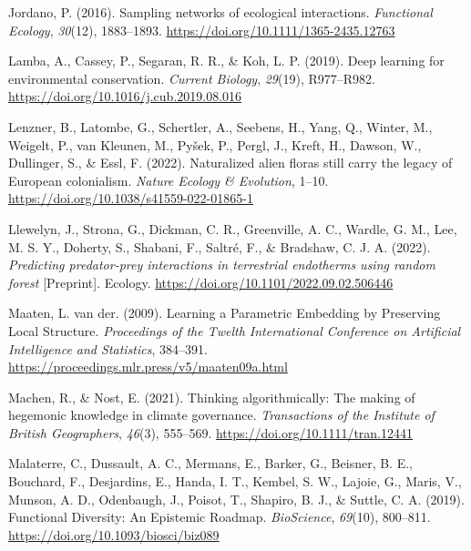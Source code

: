 \documentclass[11pt]{article}
\newlength{\cslhangindent}
\newenvironment{CSLReferences}[2] %
 {%
  \setlength{\parindent}{0pt}
  \ifodd #1 \everypar{\setlength{\hangindent}{\cslhangindent}}\ignorespaces\fi
  \ifnum #2 > 0
  \setlength{\parskip}{#2\baselineskip}
  \fi
 }%
 {}
\begin{document}
\begin{CSLReferences}{1}{0}
\leavevmode{}%
Jordano, P. (2016). Sampling networks of ecological interactions.
\emph{Functional Ecology}, \emph{30}(12), 1883--1893.
\url{https://doi.org/10.1111/1365-2435.12763}

\leavevmode{}%
Lamba, A., Cassey, P., Segaran, R. R., \& Koh, L. P. (2019). Deep
learning for environmental conservation. \emph{Current Biology},
\emph{29}(19), R977--R982.
\url{https://doi.org/10.1016/j.cub.2019.08.016}

\leavevmode{}%
Lenzner, B., Latombe, G., Schertler, A., Seebens, H., Yang, Q., Winter,
M., Weigelt, P., van Kleunen, M., Pyšek, P., Pergl, J., Kreft, H.,
Dawson, W., Dullinger, S., \& Essl, F. (2022). Naturalized alien floras
still carry the legacy of European colonialism. \emph{Nature Ecology \&
Evolution}, 1--10. \url{https://doi.org/10.1038/s41559-022-01865-1}

\leavevmode{}%
Llewelyn, J., Strona, G., Dickman, C. R., Greenville, A. C., Wardle, G.
M., Lee, M. S. Y., Doherty, S., Shabani, F., Saltré, F., \& Bradshaw, C.
J. A. (2022). \emph{Predicting predator-prey interactions in terrestrial
endotherms using random forest} {[}Preprint{]}. Ecology.
\url{https://doi.org/10.1101/2022.09.02.506446}

\leavevmode{}%
Maaten, L. van der. (2009). Learning a Parametric Embedding by
Preserving Local Structure. \emph{Proceedings of the Twelth
International Conference on Artificial Intelligence and Statistics},
384--391. \url{https://proceedings.mlr.press/v5/maaten09a.html}

\leavevmode{}%
Machen, R., \& Nost, E. (2021). Thinking algorithmically: The making of
hegemonic knowledge in climate governance. \emph{Transactions of the
Institute of British Geographers}, \emph{46}(3), 555--569.
\url{https://doi.org/10.1111/tran.12441}

\leavevmode{}%
Malaterre, C., Dussault, A. C., Mermans, E., Barker, G., Beisner, B. E.,
Bouchard, F., Desjardins, E., Handa, I. T., Kembel, S. W., Lajoie, G.,
Maris, V., Munson, A. D., Odenbaugh, J., Poisot, T., Shapiro, B. J., \&
Suttle, C. A. (2019). Functional Diversity: An Epistemic Roadmap.
\emph{BioScience}, \emph{69}(10), 800--811.
\url{https://doi.org/10.1093/biosci/biz089}


\end{CSLReferences}
\end{document}
